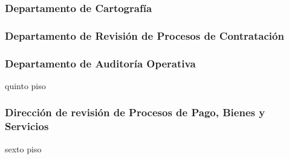 \subsubsection{Departamento de Cartografía }

\subsubsection{Departamento de Revisión de Procesos de Contratación }

\subsubsection{Departamento de Auditoría Operativa}
 {quinto piso}

\subsubsection{Dirección de revisión de Procesos de Pago, Bienes y Servicios}
 {sexto piso}





